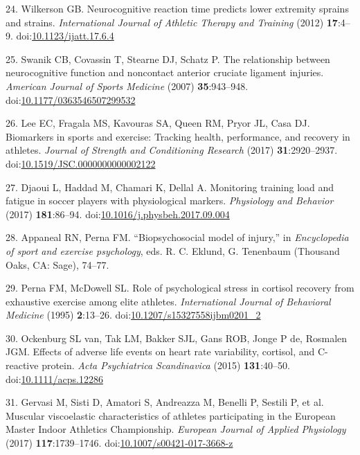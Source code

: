 \documentclass[
  english,
  man]{apa6}
\newenvironment{cslreferences}%
  {}%
  {\par}
\begin{document}
\begin{cslreferences}
\leavevmode\hypertarget{ref-Wilkerson2012a}{}%
24. Wilkerson GB. Neurocognitive reaction time predicts lower extremity sprains and strains. \emph{International Journal of Athletic Therapy and Training} (2012) \textbf{17}:4--9. doi:\href{https://doi.org/10.1123/ijatt.17.6.4}{10.1123/ijatt.17.6.4}

\leavevmode\hypertarget{ref-Swanik2007}{}%
25. Swanik CB, Covassin T, Stearne DJ, Schatz P. The relationship between neurocognitive function and noncontact anterior cruciate ligament injuries. \emph{American Journal of Sports Medicine} (2007) \textbf{35}:943--948. doi:\href{https://doi.org/10.1177/0363546507299532}{10.1177/0363546507299532}

\leavevmode\hypertarget{ref-Lee2017}{}%
26. Lee EC, Fragala MS, Kavouras SA, Queen RM, Pryor JL, Casa DJ. Biomarkers in sports and exercise: Tracking health, performance, and recovery in athletes. \emph{Journal of Strength and Conditioning Research} (2017) \textbf{31}:2920--2937. doi:\href{https://doi.org/10.1519/JSC.0000000000002122}{10.1519/JSC.0000000000002122}

\leavevmode\hypertarget{ref-Djaoui2017}{}%
27. Djaoui L, Haddad M, Chamari K, Dellal A. Monitoring training load and fatigue in soccer players with physiological markers. \emph{Physiology and Behavior} (2017) \textbf{181}:86--94. doi:\href{https://doi.org/10.1016/j.physbeh.2017.09.004}{10.1016/j.physbeh.2017.09.004}

\leavevmode\hypertarget{ref-Appaneal2014}{}%
28. Appaneal RN, Perna FM. ``Biopsychosocial model of injury,'' in \emph{Encyclopedia of sport and exercise psychology}, eds. R. C. Eklund, G. Tenenbaum (Thousand Oaks, CA: Sage), 74--77.

\leavevmode\hypertarget{ref-Perna1995}{}%
29. Perna FM, McDowell SL. Role of psychological stress in cortisol recovery from exhaustive exercise among elite athletes. \emph{International Journal of Behavioral Medicine} (1995) \textbf{2}:13--26. doi:\href{https://doi.org/10.1207/s15327558ijbm0201_2}{10.1207/s15327558ijbm0201\_2}

\leavevmode\hypertarget{ref-VanOckenburg2015a}{}%
30. Ockenburg SL van, Tak LM, Bakker SJL, Gans ROB, Jonge P de, Rosmalen JGM. Effects of adverse life events on heart rate variability, cortisol, and C-reactive protein. \emph{Acta Psychiatrica Scandinavica} (2015) \textbf{131}:40--50. doi:\href{https://doi.org/10.1111/acps.12286}{10.1111/acps.12286}

\leavevmode\hypertarget{ref-Gervasi2017}{}%
31. Gervasi M, Sisti D, Amatori S, Andreazza M, Benelli P, Sestili P, et al. Muscular viscoelastic characteristics of athletes participating in the European Master Indoor Athletics Championship. \emph{European Journal of Applied Physiology} (2017) \textbf{117}:1739--1746. doi:\href{https://doi.org/10.1007/s00421-017-3668-z}{10.1007/s00421-017-3668-z}


\end{cslreferences}
\end{document}
